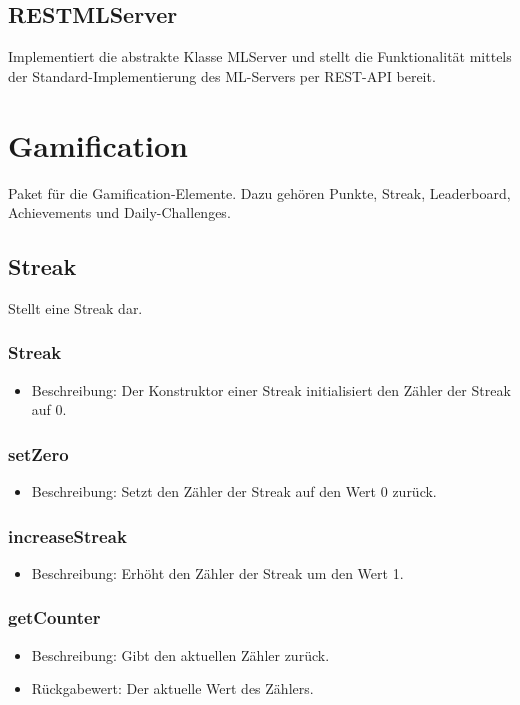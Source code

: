 \documentclass[a4paper]{scrreprt}
\begin{document}
    \subsection{RESTMLServer}
    Implementiert die abstrakte Klasse MLServer und stellt die Funktionalität mittels der Standard-Implementierung des ML-Servers per REST-API bereit.
    
    
   \section{Gamification}
   Paket für die Gamification-Elemente. Dazu gehören Punkte, Streak, Leaderboard, Achievements und Daily-Challenges.
   
   
   \subsection{Streak}
   Stellt eine Streak dar.
   
   \subsubsection{Streak}
   \begin{itemize}
   	  \item Beschreibung: Der Konstruktor einer Streak initialisiert den Zähler der Streak auf 0.
   \end{itemize}
   \subsubsection{setZero}
   \begin{itemize}
   	\item Beschreibung: Setzt den Zähler der Streak auf den Wert 0 zurück.
   \end{itemize}
   \subsubsection{increaseStreak}
   \begin{itemize}
   	\item Beschreibung: Erhöht den Zähler der Streak um den Wert 1.
   \end{itemize}
   \subsubsection{getCounter}
   \begin{itemize}
   	\item Beschreibung: Gibt den aktuellen Zähler zurück.
   	\item Rückgabewert: Der aktuelle Wert des Zählers.
   \end{itemize}
   
\end{document}
